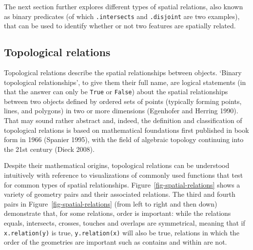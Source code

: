 \documentclass[
  letterpaper,
]{krantz}
\begin{document}
The next section further explores different types of spatial relations,
also known as binary predicates (of which \texttt{.intersects} and
\texttt{.disjoint} are two examples), that can be used to identify
whether or not two features are spatially related.

\subsection{Topological relations}\label{sec-topological-relations}

Topological relations describe the spatial relationships between
objects. `Binary topological relationships', to give them their full
name, are logical statements (in that the answer can only be
\texttt{True} or \texttt{False}) about the spatial relationships between
two objects defined by ordered sets of points (typically forming points,
lines, and polygons) in two or more dimensions (Egenhofer and Herring
1990). That may sound rather abstract and, indeed, the definition and
classification of topological relations is based on mathematical
foundations first published in book form in 1966 (Spanier 1995), with
the field of algebraic topology continuing into the 21st century (Dieck
2008).

Despite their mathematical origins, topological relations can be
understood intuitively with reference to visualizations of commonly used
functions that test for common types of spatial relationships.
Figure~\ref{fig-spatial-relations} shows a variety of geometry pairs and
their associated relations. The third and fourth pairs in
Figure~\ref{fig-spatial-relations} (from left to right and then down)
demonstrate that, for some relations, order is important: while the
relations equals, intersects, crosses, touches and overlaps are
symmetrical, meaning that if \texttt{x.relation(y)} is true,
\texttt{y.relation(x)} will also be true, relations in which the order
of the geometries are important such as contains and within are not.
\end{document}

